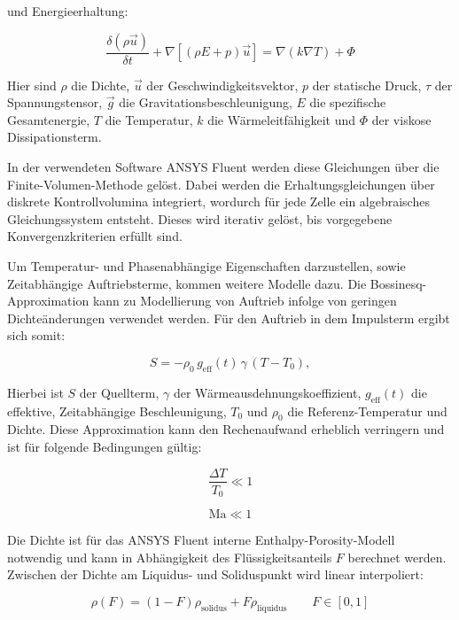 und Energieerhaltung:

\begin{equation}
  \label{eq:navier_energieerhaltung}
  \frac{\delta \left(\rho \vec{u}\right)}{\delta t} + \nabla \left[\left(\rho E + p\right)\vec{u}\right] = \nabla \left(k \nabla T\right) + \Phi
\end{equation}

Hier sind $\rho$ die Dichte, $\vec{u}$ der Geschwindigkeitsvektor, $p$ der statische Druck, $\tau$ der Spannungstensor,
$\vec{g}$ die Gravitationsbeschleunigung, $E$ die spezifische Gesamtenergie, $T$ die Temperatur, $k$ die Wärmeleitfähigkeit
und $\Phi$ der viskose Dissipationsterm.

In der verwendeten Software ANSYS Fluent werden diese Gleichungen über die Finite-Volumen-Methode gelöst. Dabei werden die Erhaltungsgleichungen
über diskrete Kontrollvolumina integriert, wordurch für jede Zelle ein algebraisches Gleichungssystem entsteht. Dieses
wird iterativ gelöst, bis vorgegebene Konvergenzkriterien erfüllt sind.

Um Temperatur- und Phasenabhängige Eigenschaften darzustellen, sowie Zeitabhängige Auftriebsterme, kommen weitere Modelle dazu.
Die Bossinesq-Approximation kann zu Modellierung von Auftrieb infolge von geringen Dichteänderungen verwendet werden. Für den Auftrieb
in dem Impulsterm ergibt sich somit:

\begin{equation}
  \label{eq:pcm_bouss}
  S = -\rho_0 \, g_\text{eff}(t)\,\gamma\,(T-T_0),
\end{equation}

Hierbei ist $S$ der Quellterm, $\gamma$ der Wärmeausdehnungskoeffizient, $g_\text{eff}(t)$ die effektive, Zeitabhängige Beschleunigung,
$T_0$ und $\rho_0$ die Referenz-Temperatur und Dichte. Diese Approximation kann den Rechenaufwand erheblich verringern und ist für folgende Bedingungen gültig:

\noindent\begin{minipage}{.5\linewidth}
  \begin{equation}
    \label{eq:bossinesque_bedingung1}
    \frac{\Delta T}{T_0} \ll 1
  \end{equation}
\end{minipage}%
\begin{minipage}{.5\linewidth}
  \begin{equation}
    \label{eq:bossinesque_bedingung2}
    \text{Ma} \ll 1
  \end{equation}
\end{minipage}

Die Dichte ist für das ANSYS Fluent interne Enthalpy-Porosity-Modell notwendig und kann in Abhängigkeit des Flüssigkeitsanteils $F$ berechnet werden.
Zwischen der Dichte am Liquidus- und Soliduspunkt wird linear interpoliert:

\begin{equation}
  \label{eq:pcm_dichte}
  \rho(F) = \left(1- F\right) \rho_\text{solidus} + F \rho_\text{liquidus} \qquad F \in [0,1]
\end{equation}